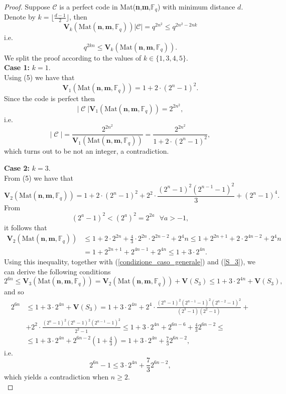 \documentclass[10pt,a4paper]{amsart}
\DeclareMathOperator{\C}{\mathcal{C}}
\begin{document}
\begin{proof}
Suppose $\mathcal{C}$ is a perfect code in Mat(\textbf{n},\textbf{m},$\mathbb{F}_q$) with minimum distance $d$. Denote by $k=\lfloor \frac{d-1}2\rfloor$, then
\[
\mathbf{V}_k(\text{Mat}(\textbf{n},\textbf{m},\mathbb{F}_q))\lvert\mathcal{C}\rvert=q^{2n^2}\leq q^{2n^2-2nk}
\]
i.e.
\begin{equation}\label{condizione_caso_generale}
q^{2kn}\leq \mathbf{V}_k(\text{Mat}(\textbf{n},\textbf{m},\mathbb{F}_q)).
\end{equation}
We split the proof according to the values of $k \in\{1,3,4,5\}$.\\

\textbf{Case 1:} $k=1$.\\
Using (5) we have that
\[
\mathbf{V}_1(\text{Mat}(\textbf{n},\textbf{m},\mathbb{F}_q))=1+2\cdot(2^n-1)^2.
\]
Since the code is perfect then 
\[ |\C| \mathbf{V}_1(\text{Mat}(\textbf{n},\textbf{m},\mathbb{F}_q))=2^{2n^2},  \]
i.e. 
\[ |\C|=\frac{2^{2n^2}}{ \mathbf{V}_1(\text{Mat}(\textbf{n},\textbf{m},\mathbb{F}_q))}=\frac{2^{2n^2}}{1+2\cdot(2^n-1)^2},  \]
which turns out to be not an integer, a contradiction.

\textbf{Case 2:} $k=3$.\\
From (5) we have that
\[
\mathbf{V}_2(\text{Mat}(\textbf{n},\textbf{m},\mathbb{F}_q))=1+2\cdot(2^n-1)^2+2^2\cdot\frac{(2^n-1)^2(2^{n-1}-1)^2}{3}+(2^n-1)^4.
\]
From
\begin{equation}\label{disuguaglianza_a}
(2^a-1)^2<(2^a)^2=2^{2a}\ \ \ \forall a>-1,
\end{equation}
it follows that
\[
\begin{aligned}
\mathbf{V}_2(\text{Mat}(\textbf{n},\textbf{m},\mathbb{F}_q))&\leq 1+2\cdot 2^{2n}+\frac{4}{3}\cdot2^{2n}\cdot2^{2n-2}+2^4n\leq 1+2^{2n+1}+2\cdot2^{4n-2}+2^4n\\&=1+2^{2n+1}+2^{4n-1}+2^{4n}\leq1+3\cdot2^{4n}.
\end{aligned}
\]
Using this inequality, together with (\ref{condizione_caso_generale}) and (\ref{S_3}), we can derive the following conditions
\[
2^{6n}\leq\mathbf{V}_3(\text{Mat}(\textbf{n},\textbf{m},\mathbb{F}_q))=\mathbf{V}_2(\text{Mat}(\textbf{n},\textbf{m},\mathbb{F}_q))+\mathbf{V}(S_3)\leq 1+3\cdot2^{4n}+\textbf{V}(S_3),
\]
and so
\[
	\begin{aligned}
	2^{6n}&\leq 1+3\cdot2^{4n}+\textbf{V}(S_3)=1+3\cdot2^{4n}+2^4\cdot\frac{(2^n-1)^2(2^{n-1}-1)^2(2^{n-2}-1)^2}{(2^3-1)(2^2-1)}+\\&+2^2\cdot\frac{(2^n-1)^2(2^n-1)^2(2^{n-1}-1)^2}{2^2-1}\leq 1+3\cdot2^{4n}+2^{6n-6}+\frac{4}{3}2^{6n-2}\leq\\&\leq1+3\cdot2^{4n}+2^{6n-2}\left(1+\frac{4}{3}\right)=1+3\cdot2^{4n}+\frac{7}{3}2^{6n-2},
\end{aligned}
\]
i.e.
\[
2^{6n}-1\leq3\cdot2^{4n}+\frac{7}{3}2^{6n-2},
\]
which yields a contradiction when $n\geq2$.\\


\end{proof}
\end{document}

